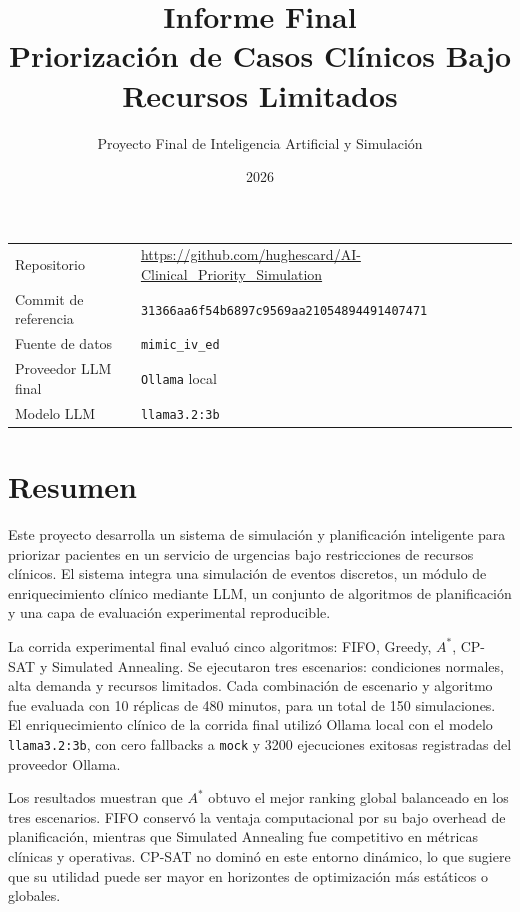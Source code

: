\documentclass[12pt,a4paper]{article}
\title{\textbf{Informe Final}\\Priorización de Casos Clínicos Bajo Recursos Limitados}
\author{Proyecto Final de Inteligencia Artificial y Simulación}
\date{2026}
\begin{document}
\maketitle

\begin{center}
\begin{tabular}{ll}
\toprule
Repositorio & \url{https://github.com/hughescard/AI-Clinical_Priority_Simulation} \\
Commit de referencia & \texttt{31366aa6f54b6897c9569aa21054894491407471} \\
Fuente de datos & \texttt{mimic\_iv\_ed} \\
Proveedor LLM final & \texttt{Ollama} local \\
Modelo LLM & \texttt{llama3.2:3b} \\
\bottomrule
\end{tabular}
\end{center}

\section*{Resumen}

Este proyecto desarrolla un sistema de simulación y planificación inteligente para priorizar pacientes en un servicio de urgencias bajo restricciones de recursos clínicos. El sistema integra una simulación de eventos discretos, un módulo de enriquecimiento clínico mediante LLM, un conjunto de algoritmos de planificación y una capa de evaluación experimental reproducible.

La corrida experimental final evaluó cinco algoritmos: FIFO, Greedy, $A^*$, CP-SAT y Simulated Annealing. Se ejecutaron tres escenarios: condiciones normales, alta demanda y recursos limitados. Cada combinación de escenario y algoritmo fue evaluada con 10 réplicas de 480 minutos, para un total de 150 simulaciones. El enriquecimiento clínico de la corrida final utilizó Ollama local con el modelo \texttt{llama3.2:3b}, con cero fallbacks a \texttt{mock} y 3200 ejecuciones exitosas registradas del proveedor Ollama.

Los resultados muestran que $A^*$ obtuvo el mejor ranking global balanceado en los tres escenarios. FIFO conservó la ventaja computacional por su bajo overhead de planificación, mientras que Simulated Annealing fue competitivo en métricas clínicas y operativas. CP-SAT no dominó en este entorno dinámico, lo que sugiere que su utilidad puede ser mayor en horizontes de optimización más estáticos o globales.
\end{document}
